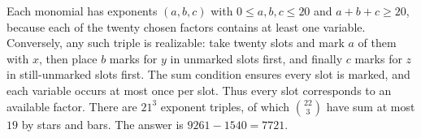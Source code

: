 Each monomial has exponents $(a,b,c)$ with $0\le a,b,c\le20$ and $a+b+c\ge20$, because each of the twenty chosen factors contains at least one variable. Conversely, any such triple is realizable: take twenty slots and mark $a$ of them with $x$, then place $b$ marks for $y$ in unmarked slots first, and finally $c$ marks for $z$ in still-unmarked slots first. The sum condition ensures every slot is marked, and each variable occurs at most once per slot. Thus every slot corresponds to an available factor. There are $21^3$ exponent triples, of which $\binom{22}3$ have sum at most $19$ by stars and bars. The answer is $9261-1540=\boxed{7721}$.
